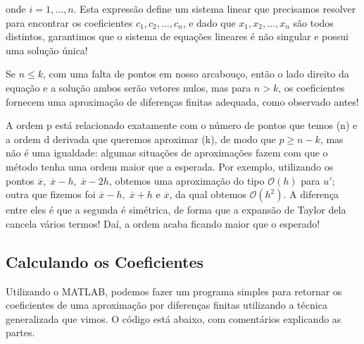 \documentclass[../differential_methods.tex]{subfiles}
\begin{document}
onde \(i=1,\dotsc ,n\). Esta expressão define um sistema linear que precisamos resolver para encontrar os coeficientes \(c_1,c_2,\dotsc ,c_{n}\), e dado que \(x_1,x_2,\dotsc ,x_n\) são todos distintos, garantimos que o sistema de equações lineares é não singular e possui uma solução única!
\begin{tcolorbox}[
		skin=enhanced,
		title=Observação,
		fonttitle=\bfseries,
		colframe=black,
		colbacktitle=cyan!75!white,
		colback=cyan!15,
		colbacklower=black,
		coltitle=black,
		drop fuzzy shadow,
	]
	Se \(n\leq k\), com uma falta de pontos em nosso arcabouço, então o lado direito da equação e a solução ambos serão vetores nulos, mas para \(n>k\), os coeficientes fornecem uma aproximação de diferenças finitas adequada, como observado antes!

	A ordem p está relacionado exatamente com o número de pontos que temos (n) e a ordem d derivada que queremos aproximar (k), de modo que \(p\geq n-k\), mas não é uma igualdade: algumas situações de aproximações fazem com que o método tenha uma ordem maior que a esperada.
	Por exemplo, utilizando os pontos \(\overline{x},\; \overline{x}-h,\; \overline{x}-2h\), obtemos uma aproximação do tipo \(\mathcal{O}(h)\) para \(u'\); outra que fizemos foi \(\overline{x}-h, \; \overline{x}+h\) e \(\overline{x}\), da qual obtemos \(\mathcal{O}(h^{2})\).
	A diferença entre eles é que a segunda é simétrica, de forma que a expansão de Taylor dela cancela vários termos! Daí, a ordem acaba ficando maior que o esperado!
\end{tcolorbox}

\subsection{Calculando os Coeficientes}
Utilizando o MATLAB, podemos fazer um programa simples para retornar os coeficientes de uma aproximação por diferenças finitas utilizando a técnica generalizada que vimos. O código está abaixo, com comentários explicando as partes.
\end{document}
